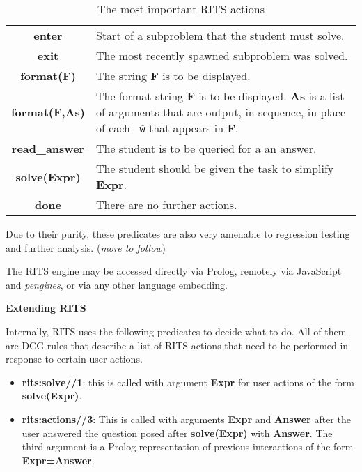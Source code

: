 \documentclass[a4paper,11pt]{article}
\begin{document}
\begin{table}[ht]
  \centering
  \begin{tabular}{cp{7cm}}
    \hline
    \textbf{enter} & Start of a subproblem that the student must solve.\\
    \textbf{exit} & The most recently spawned subproblem was solved.\\
    \textbf{format(F)} & The string \textbf{F} is to be displayed.\\
    \textbf{format(F,As)} & The format string \textbf{F} is to be displayed. \textbf{As} is a list of arguments that are output, in sequence, in place of each \texttt{\~\ $\!\!\!$w} that appears in \textbf{F}.\\
    \textbf{read\_answer} & The student is to be queried for a an answer.\\
    \textbf{solve(Expr)} & The student should be given the task to simplify \textbf{Expr}.\\
    \textbf{done} & There are no further actions.\\
    \hline
  \end{tabular}
\caption{The most important RITS actions}
  \label{tab:ritsactions}
\end{table}


\vspace{0.7cm}

Due to their purity, these predicates are also very amenable to
regression testing and further analysis. (\textit{more to follow})

\vspace{0.7cm}

The RITS engine may be accessed directly via Prolog, remotely via
JavaScript and \textit{pengines}, or via any other language embedding.

\bigskip
\begin{center}
  \large\textbf{Extending RITS}
\end{center}

\medskip
\noindent Internally, RITS uses the following predicates to decide
what to do. All of them are DCG rules that describe a list of RITS
actions that need to be performed in response to certain user actions.

\begin{itemize}
\item \textbf{rits:solve//1}: this is called with argument \textbf{Expr}
  for user actions of the form \textbf{solve(Expr)}.

\item \textbf{rits:actions//3}: This is called with arguments \textbf{Expr}
  and \textbf{Answer} after the user answered the question posed after
  \textbf{solve(Expr)} with \textbf{Answer}. The third argument is a
  Prolog representation of previous interactions of the form
  \textbf{Expr=Answer}.

\end{itemize}
\end{document}
